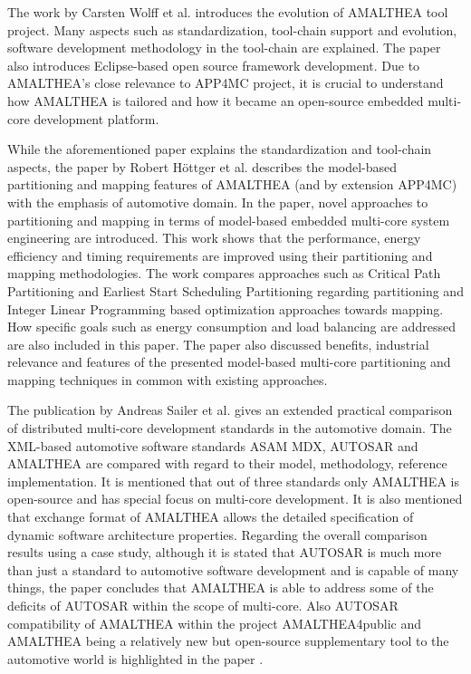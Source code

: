 The work by Carsten Wolff et al. \cite{toolchaintailoringapp4mc} introduces the evolution of AMALTHEA tool project. Many aspects such as standardization, tool-chain support and evolution, software development methodology in the tool-chain are explained. The paper also introduces Eclipse-based open source framework development. Due to AMALTHEA's close relevance to APP4MC project, it is crucial to understand how AMALTHEA is tailored and how it became an open-source embedded multi-core development platform. 

While the aforementioned paper explains the standardization and tool-chain aspects, the paper by Robert H{\"o}ttger et al. \cite{priorpaperapp4mc} describes the model-based partitioning and mapping features of AMALTHEA (and by extension APP4MC) with the emphasis of automotive domain. In the paper, novel approaches to partitioning and mapping in terms of model-based embedded multi-core system engineering are introduced. This work shows that the performance, energy efficiency and timing requirements are improved using their partitioning and mapping methodologies. The work compares approaches such as Critical Path Partitioning and Earliest Start Scheduling Partitioning regarding partitioning and Integer Linear Programming based optimization approaches towards mapping. How specific goals such as energy consumption and load balancing are addressed are also included in this paper. The paper also discussed benefits, industrial relevance and features of the presented model-based multi-core partitioning and mapping techniques in common with existing approaches.

The publication by Andreas Sailer et al. \cite{comparisonpaperapp4mc} gives an extended practical comparison of distributed multi-core development standards in the automotive domain. The XML-based automotive software standards ASAM MDX, AUTOSAR and AMALTHEA are compared with regard to their model, methodology, reference implementation. It is mentioned that out of three standards only AMALTHEA is open-source and has special focus on multi-core development. It is also mentioned that exchange format of AMALTHEA allows the detailed specification of dynamic software architecture properties. Regarding the overall comparison results using a case study, although it is stated that AUTOSAR is much more than just a standard to automotive software development and is capable of many things, the paper concludes that AMALTHEA is able to address some of the deficits of AUTOSAR within the scope of multi-core. Also AUTOSAR compatibility of AMALTHEA within the project AMALTHEA4public and AMALTHEA being a relatively new but open-source supplementary tool to the automotive world is highlighted in the paper \cite{comparisonpaperapp4mc}.

